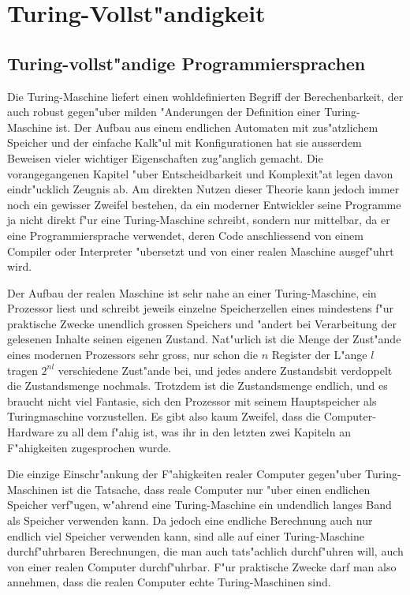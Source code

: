 %
%
%
\chapter{Turing-Vollst"andigkeit\label{chapter-vollstaendigkeit}}
\section{Turing-vollst"andige Programmiersprachen}
Die Turing-Maschine liefert einen wohldefinierten Begriff der
Berechenbarkeit, der auch robust gegen"uber milden "Anderungen
der Definition einer Turing-Maschine ist.
Der Aufbau aus einem endlichen Automaten mit zus"atzlichem
Speicher und der einfache Kalk"ul mit Konfigurationen hat
sie ausserdem Beweisen vieler wichtiger Eigenschaften zug"anglich
gemacht. Die vorangegangenen Kapitel "uber Entscheidbarkeit und
Komplexit"at legen davon eindr"ucklich Zeugnis ab. Am direkten
Nutzen dieser Theorie kann jedoch immer noch ein gewisser Zweifel
bestehen, da ein moderner Entwickler seine Programme ja nicht
direkt f"ur eine Turing-Maschine schreibt, sondern nur mittelbar,
da er eine Programmiersprache verwendet, deren Code anschliessend
von einem Compiler oder Interpreter "ubersetzt und von einer realen
Maschine ausgef"uhrt wird.

Der Aufbau der realen Maschine ist sehr
nahe an einer Turing-Maschine, ein Prozessor liest und schreibt
jeweils einzelne
Speicherzellen eines mindestens f"ur praktische Zwecke unendlich
grossen Speichers und "andert bei Verarbeitung der gelesenen
Inhalte seinen eigenen Zustand. Nat"urlich ist die Menge der
Zust"ande eines modernen Prozessors sehr gross, nur schon die $n$
Register der L"ange $l$ tragen $2^{nl}$ verschiedene Zust"ande bei,
und jedes andere Zustandsbit verdoppelt die Zustandsmenge nochmals.
Trotzdem ist die Zustandsmenge endlich, und es braucht nicht viel
Fantasie, sich den Prozessor mit seinem Hauptspeicher als Turingmaschine
vorzustellen. Es gibt also kaum Zweifel, dass die Computer-Hardware
zu all dem f"ahig ist, was ihr in den letzten zwei Kapiteln an
F"ahigkeiten zugesprochen wurde.

Die einzige Einschr"ankung der F"ahigkeiten realer Computer gegen"uber
Turing-Maschinen ist
die Tatsache, dass reale Computer nur "uber einen endlichen Speicher
verf"ugen, w"ahrend eine Turing-Maschine ein undendlich langes Band
als Speicher verwenden kann. Da jedoch eine endliche Berechnung auch
nur endlich viel Speicher verwenden kann, sind alle auf einer Turing-Maschine
durchf"uhrbaren Berechnungen, die man auch tats"achlich durchf"uhren
will, auch von einer realen Computer durchf"uhrbar. F"ur praktische
Zwecke darf man also annehmen, dass die realen Computer echte Turing-Maschinen
sind.

